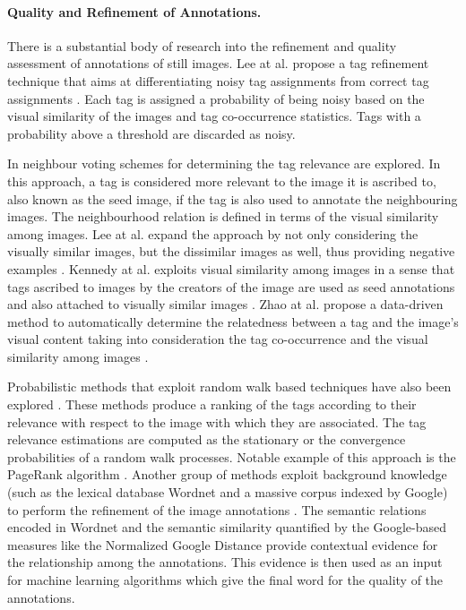 \paragraph{Quality and Refinement of Annotations.} There is a substantial body of research into the refinement and quality assessment of annotations of still images. Lee at al. propose a tag refinement technique that aims at
differentiating noisy tag assignments from correct tag assignments \cite{Lee:2010:TRI:1890924.1891010}. Each tag is assigned a probability of being noisy based on the visual similarity of the images and tag co-occurrence statistics. Tags with a probability above a threshold are discarded as noisy. 

In \cite{Truong:2012:CSK:2324796.2324808,Li:2008:LTR:1460096.1460126} neighbour voting schemes for determining the tag relevance are explored. In this approach, a tag is considered more relevant to the image it is ascribed to, also known as the seed image, if the tag is also used to annotate the neighbouring images. The neighbourhood relation is defined in terms of the visual similarity among images. Lee at al. expand the approach by not only considering the visually similar images, but the dissimilar images as well, thus providing negative examples \cite{Lee:2012:TDE:2390876.2390880}. Kennedy at al. exploits visual similarity among images in a sense that tags ascribed to images by the creators of the image are used as seed annotations and also attached to visually similar images \cite{Kennedy:2009:RTU:1631135.1631139}. Zhao at al. propose a data-driven method to automatically determine the relatedness between a tag and the image's visual content taking into consideration the tag co-occurrence and the visual similarity among images \cite{Zhao:2010:TRV:2174490.2174571}.

Probabilistic methods that exploit random walk based techniques have also been explored \cite{Wang:2006:IAR:1180639.1180774,Liu:2009:TR:1526709.1526757,Li:2012:TRP:2382336.2382380}. These methods produce a ranking of the tags according to their relevance with respect to the image with which they are associated. The tag relevance estimations are computed as the stationary or the convergence probabilities of  a random walk processes. Notable example of this approach is the PageRank algorithm \cite{journals/corr/abs-1012-4872,10.4137/GRSB.S702,junker2008analysis}. Another group of methods exploit background knowledge (such as the lexical database Wordnet and a massive corpus indexed by Google) to perform the refinement of the image annotations \cite{Jin:2010:KBI:1731523.1731529,Wang:2007:RIA:1282280.1282343}. The semantic relations encoded in Wordnet and the semantic similarity quantified by the Google-based measures like the Normalized Google Distance \cite{DBLP:journals/corr/abs-cs-0412098} provide contextual evidence for the relationship among the annotations. This evidence is then used as an input for machine learning algorithms which give the final word for the quality of the annotations. 

